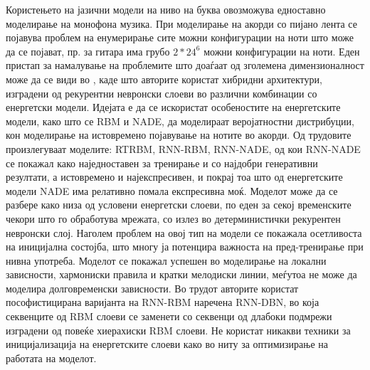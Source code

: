 Користењето на јазични модели на ниво на буква овозможува едноставно моделирање на монофона музика. При моделирање на акорди со пијано лента се појавува проблем на енумерирање сите можни конфигурации на ноти што може да се појават, пр. за гитара има грубо $2*24^6$ можни конфигурации на ноти. Еден пристап за намалување на проблемите што доаѓаат од зголемена димензионалност може да се види во \cite{Boulanger-Lewandowski2012, Boulanger-Lewandowski2014, Goel2014}, каде што авторите користат хибридни архитектури, изградени од рекурентни невронски слоеви во различни комбинации со енергетски модели. Идејата е да се искористат особеностите на енергетските модели, како што се RBM и NADE, да моделираат веројатностни дистрибуции, кон моделирање на истовремено појавување на нотите во акорди. Од трудовите \cite{Boulanger-Lewandowski2012, Boulanger-Lewandowski2014} произлегуваат моделите: RTRBM, RNN-RBM, RNN-NADE, од кои RNN-NADE се покажал како наједноставен за тренирање и со најдобри генеративни резултати, а истовремено и најекспресивен, и покрај тоа што од енергетските модели NADE има релативно помала експресивна моќ. Моделот може да се разбере како низа од условени енергетски слоеви, по еден за секој временските чекори што го обработува мрежата, со излез во детерминистички рекурентен невронски слој. Наголем проблем на овој тип на модели се покажала осетливоста на иницијална состојба, што многу ја потенцира важноста на пред-тренирање при нивна употреба. Моделот се покажал успешен во моделирање на локални зависности, хармониски правила и кратки мелодиски линии, меѓутоа не може да моделира долговременски зависности. Во трудот \cite{Goel2014} авторите користат пософистицирана варијанта на RNN-RBM наречена RNN-DBN, во која секвенците од RBM слоеви се заменети со секвенци од длабоки подмрежи изградени од повеќе хиерахиски RBM слоеви. Не користат никакви техники за иницијализација на енергетските слоеви како во \cite{Boulanger-Lewandowski2012, Boulanger-Lewandowski2014, Goel2014} ниту за оптимизирање на работата на моделот.

